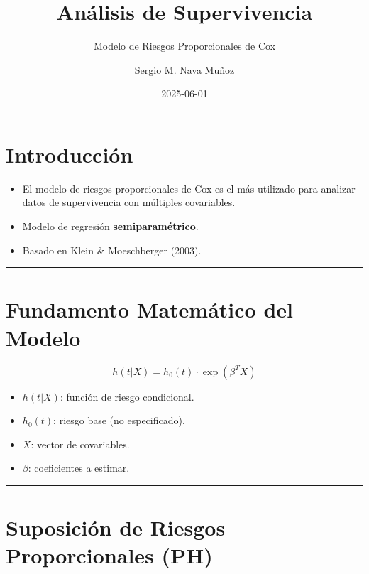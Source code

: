 \documentclass[
]{article}
\title{Análisis de Supervivencia}
\subtitle{Modelo de Riesgos Proporcionales de Cox}
\author{Sergio M. Nava Muñoz}
\date{2025-06-01}
\providecommand{\tightlist}{%
  \setlength{\itemsep}{0pt}\setlength{\parskip}{0pt}}
\renewcommand*\contentsname{Table of contents}
\newcommand\contentsname{Table of contents}
\begin{document}
\maketitle

\renewcommand*\contentsname{Table of contents}
{
\hypersetup{linkcolor=}
\setcounter{tocdepth}{2}
\tableofcontents
}

\section{Introducción}\label{introducciuxf3n}

\begin{itemize}
\tightlist
\item
  El modelo de riesgos proporcionales de Cox es el más utilizado para
  analizar datos de supervivencia con múltiples covariables.
\item
  Modelo de regresión \textbf{semiparamétrico}.
\item
  Basado en Klein \& Moeschberger (2003).
\end{itemize}

\begin{center}\rule{0.5\linewidth}{0.5pt}\end{center}

\section{Fundamento Matemático del
Modelo}\label{fundamento-matemuxe1tico-del-modelo}

\[
h(t|X) = h_0(t) \cdot \exp(\beta^T X)
\]

\begin{itemize}
\tightlist
\item
  \(h(t|X)\): función de riesgo condicional.
\item
  \(h_0(t)\): riesgo base (no especificado).
\item
  \(X\): vector de covariables.
\item
  \(\beta\): coeficientes a estimar.
\end{itemize}

\begin{center}\rule{0.5\linewidth}{0.5pt}\end{center}

\section{Suposición de Riesgos Proporcionales
(PH)}\label{suposiciuxf3n-de-riesgos-proporcionales-ph}
\end{document}
